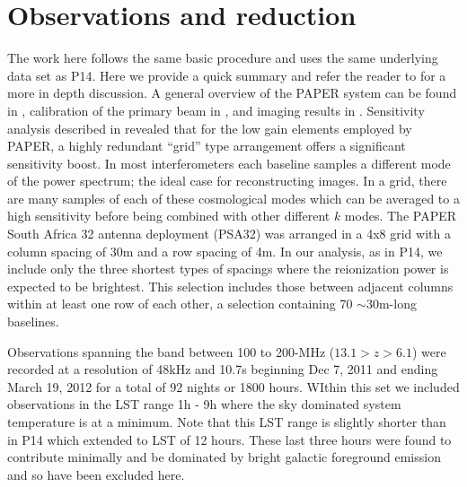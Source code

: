 \documentclass[preprint]{aastex}
\begin{document}
%



\section{Observations and reduction}
\label{sec:observations}
The work here follows the same basic procedure and uses the same underlying data set as P14. Here we provide a quick summary and refer the reader to \cite{Parsons:2013p9876} for a more in depth discussion.  A general overview of the PAPER system can be found in \cite{Parsons:2010p6757}, calibration of the primary beam in \cite{Pober:2012p8800}, and imaging results in \cite{Jacobs:2011p8438,Jacobs:2013p10014,Stefan:2013p9926}.  Sensitivity analysis described in \cite{Parsons:2012p9028} revealed that for the low gain elements employed by PAPER, a highly redundant ``grid'' type arrangement offers a significant sensitivity boost.  In most interferometers each baseline samples a different mode of the power spectrum; the ideal case for reconstructing images.  In a grid, there are many samples of each of these cosmological modes which can be averaged to a high sensitivity before being combined with other different $k$ modes.  The PAPER South Africa 32 antenna deployment (PSA32) was arranged in a 4x8 grid with a column spacing of 30m and a row spacing of 4m.  In our analysis, as in P14, we include only the three shortest types of spacings where the reionization power is expected to be brightest. This selection includes those between adjacent columns within at least one row of each other, a selection containing 70 $\sim$30m-long baselines.

Observations spanning the band between 100 to 200-MHz ($13.1>z>6.1$) were recorded at a resolution of 48kHz and 10.7s  beginning Dec 7, 2011 and ending March 19, 2012 for a total of 92 nights or 1800 hours.  WIthin this set we included observations in the LST range 1h - 9h where the sky dominated system temperature is at a minimum.  Note that this LST range is slightly shorter than in P14 which extended to LST of 12 hours. These last three hours were found to contribute minimally and be dominated by bright galactic foreground emission and so have been excluded here.
\end{document}
